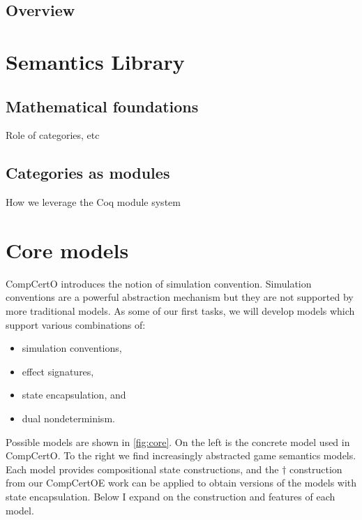 \documentclass{article}
\begin{document}
\subsection{Overview}

\newpage


\section{Semantics Library}

\subsection{Mathematical foundations}

Role of categories, etc

\subsection{Categories as modules}

How we leverage the Coq module system

\newpage

\section{Core models} %

CompCertO introduces the notion of simulation convention.
Simulation conventions are a powerful abstraction mechanism
but they are not supported by more traditional models.
As some of our first tasks,
we will develop models which support various combinations of:
\begin{itemize}
  \item simulation conventions,
  \item effect signatures,
  \item state encapsulation, and
  \item dual nondeterminism.
\end{itemize}

Possible models are shown in \autoref{fig:core}.
On the left is the concrete model used in CompCertO.
To the right we find increasingly abstracted game semantics models.
Each model provides compositional state constructions, and
the $\dagger$ construction from our CompCertOE work
can be applied to obtain versions of the models with
state encapsulation.
Below I expand on the construction and features of each model.
\end{document}
